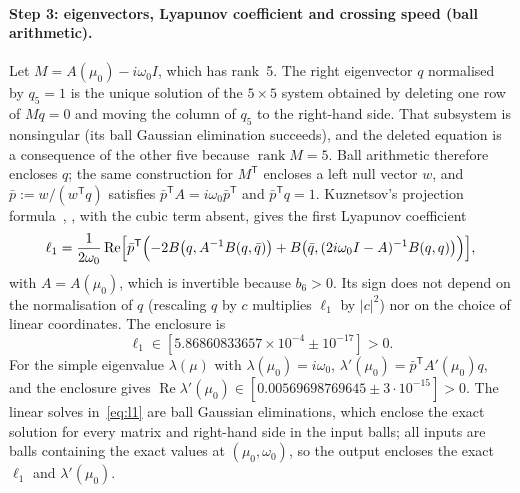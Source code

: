 \documentclass[11pt,a4paper]{report}
\begin{document}
\paragraph{Step 3: eigenvectors, Lyapunov coefficient and crossing speed (ball arithmetic).} Let $M=A(\mu_0)-i\omega_0I$, which has rank~5. The right eigenvector $q$ normalised by $q_5=1$ is the unique solution of the $5\times5$ system obtained by deleting one row of $Mq=0$ and moving the column of $q_5$ to the right-hand side. That subsystem is nonsingular (its ball Gaussian elimination succeeds), and the deleted equation is a consequence of the other five because $\operatorname{rank}M=5$. Ball arithmetic therefore encloses $q$; the same construction for $M^{\mathsf T}$ encloses a left null vector $w$, and $\bar p:=w/(w^{\mathsf T}q)$ satisfies $\bar p^{\mathsf T}A=i\omega_0\bar p^{\mathsf T}$ and $\bar p^{\mathsf T}q=1$. Kuznetsov's projection formula~\autocite{Kuznetsov1999}, \autocite[§3.5 and Ch.~5]{Kuznetsov2004}, with the cubic term absent, gives the first Lyapunov coefficient
\begin{equation}\label{eq:l1}
\ell_1=\frac{1}{2\omega_0}\operatorname{Re}\Bigl[\bar p^{\mathsf T}\Bigl(-2B\bigl(q,A^{-1}B(q,\bar q)\bigr)+B\bigl(\bar q,(2i\omega_0I-A)^{-1}B(q,q)\bigr)\Bigr)\Bigr],
\end{equation}
with $A=A(\mu_0)$, which is invertible because $b_6>0$. Its sign does not depend on the normalisation of $q$ (rescaling $q$ by $c$ multiplies $\ell_1$ by $|c|^2$) nor on the choice of linear coordinates. The enclosure is
\[
\ell_1\in[5.86860833657\times10^{-4}\pm10^{-17}]>0 .
\]
For the simple eigenvalue $\lambda(\mu)$ with $\lambda(\mu_0)=i\omega_0$, $\lambda'(\mu_0)=\bar p^{\mathsf T}A'(\mu_0)q$, and the enclosure gives $\operatorname{Re}\lambda'(\mu_0)\in[0.00569698769645\pm3\cdot10^{-15}]>0$. The linear solves in~\eqref{eq:l1} are ball Gaussian eliminations, which enclose the exact solution for every matrix and right-hand side in the input balls; all inputs are balls containing the exact values at $(\mu_0,\omega_0)$, so the output encloses the exact $\ell_1$ and $\lambda'(\mu_0)$.
\end{document}
